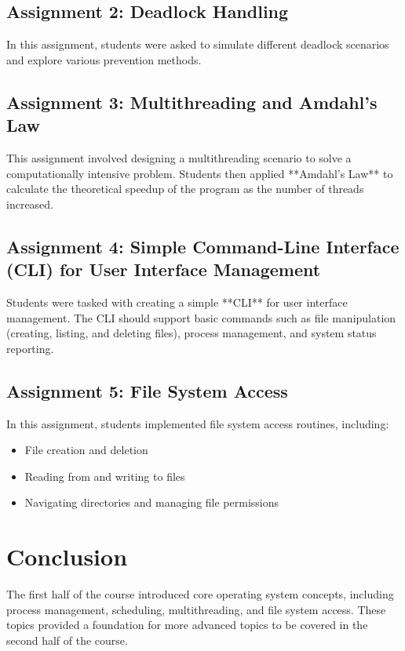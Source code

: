 \documentclass[12pt]{article}
\begin{document}
	\subsection{Assignment 2: Deadlock Handling}
	In this assignment, students were asked to simulate different deadlock scenarios and explore various prevention methods.
	
	\subsection{Assignment 3: Multithreading and Amdahl's Law}
	This assignment involved designing a multithreading scenario to solve a computationally intensive problem. Students then applied **Amdahl's Law** to calculate the theoretical speedup of the program as the number of threads increased.
	
	\subsection{Assignment 4: Simple Command-Line Interface (CLI) for User Interface Management}
	Students were tasked with creating a simple **CLI** for user interface management. The CLI should support basic commands such as file manipulation (creating, listing, and deleting files), process management, and system status reporting.
	
	\subsection{Assignment 5: File System Access}
	In this assignment, students implemented file system access routines, including:
	\begin{itemize}
		\item File creation and deletion
		\item Reading from and writing to files
		\item Navigating directories and managing file permissions
	\end{itemize}
	
	\section{Conclusion}
	The first half of the course introduced core operating system concepts, including process management, scheduling, multithreading, and file system access. These topics provided a foundation for more advanced topics to be covered in the second half of the course.
	
\end{document}
